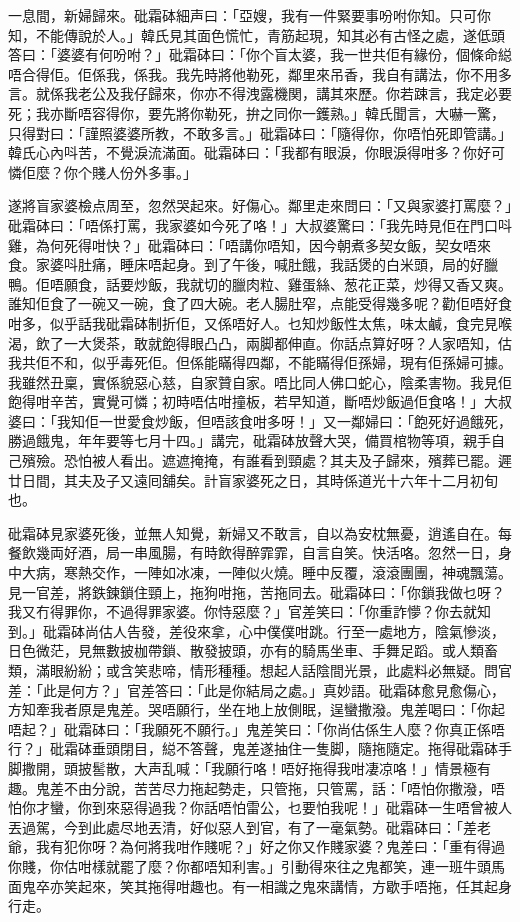 \documentclass[a5paper, 12pt, openany]{book} %
\begin{document}
	一息間，新婦歸來。砒霜砵細声曰：「亞嫂，我有一件緊要事吩咐你知。只可你知，不能傳說於人。」韓氏見其面色慌忙，青筋起現，知其必有古怪之處，遂低頭答曰：「婆婆有何吩咐？」砒霜砵曰：「你个盲太婆，我一世共佢有緣份，個條命縂唔合得佢。佢係我，係我。我先時將他勒死，鄰里來吊香，我自有講法，你不用多言。就係我老公及我仔歸來，你亦不得洩露機関，講其來歷。你若踈言，我定必要死；我亦斷唔容得你，要先將你勒死，拚之同你一鑊熟。」韓氏聞言，大嚇一驚，只得對曰：「謹照婆婆所教，不敢多言。」砒霜砵曰：「隨得你，你唔怕死即管講。」韓氏心內呌苦，不覺淚流滿面。砒霜砵曰：「我都有眼淚，你眼淚得咁多？你好可憐佢麼？你个賤人份外多事。」

	遂將盲家婆檢点周至，忽然哭起來。好傷心。鄰里走來問曰：「又與家婆打罵麼？」砒霜砵曰：「唔係打罵，我家婆如今死了咯！」大叔婆驚曰：「我先時見佢在門口呌雞，為何死得咁快？」砒霜砵曰：「唔講你唔知，因今朝煮多契女飯，契女唔來食。家婆呌肚痛，睡床唔起身。到了午後，喊肚餓，我話煲的白米頭，局的好臘鴨。佢唔願食，話要炒飯，我就切的臘肉粒、雞蛋絲、葱花正菜，炒得又香又爽。誰知佢食了一碗又一碗，食了四大碗。老人腸肚窄，点能受得幾多呢？勸佢唔好食咁多，似乎話我砒霜砵制折佢，又係唔好人。乜知炒飯性太焦，味太鹹，食完見喉渴，飲了一大煲茶，敢就飽得眼凸凸，兩脚都伸直。你話点算好呀？人家唔知，估我共佢不和，似乎毒死佢。但係能瞞得四鄰，不能瞞得佢孫婦，現有佢孫婦可據。我雖然丑稟，實係貌惡心慈，自家贊自家。唔比同人佛口蛇心，陰柔害物。我見佢飽得咁辛苦，實覺可憐；初時唔估咁撞板，若早知道，斷唔炒飯過佢食咯！」大叔婆曰：「我知佢一世愛食炒飯，但唔該食咁多呀！」又一鄰婦曰：「飽死好過餓死，勝過餓鬼，年年要等七月十四。」講完，砒霜砵放聲大哭，備買棺物等項，親手自己殯殮。恐怕被人看出。遮遮掩掩，有誰看到頸處？其夫及子歸來，殯葬已罷。遲廿日間，其夫及子又遠囘舖矣。計盲家婆死之日，其時係道光十六年十二月初旬也。

	砒霜砵見家婆死後，並無人知覺，新婦又不敢言，自以為安枕無憂，逍遙自在。每餐飲幾両好酒，局一串風腸，有時飲得醉霏霏，自言自笑。快活咯。忽然一日，身中大病，寒熱交作，一陣如冰凍，一陣似火燒。睡中反覆，滾滾團團，神魂飄蕩。見一官差，將鉄鍊鎖住頸上，拖狗咁拖，苦拖同去。砒霜砵曰：「你鎖我做乜呀？我又冇得罪你，不過得罪家婆。你恃惡麼？」官差笑曰：「你重詐懜？你去就知到。」砒霜砵尚估人告發，差役來拿，心中僕僕咁跳。行至一處地方，陰氣慘淡，日色微茫，見無數披枷帶鎖、散發披頭，亦有的騎馬坐車、手舞足蹈。或人類畜類，滿眼紛紛；或含笑悲啼，情形種種。想起人話陰間光景，此處料必無疑。問官差：「此是何方？」官差答曰：「此是你結局之處。」真妙語。砒霜砵愈見愈傷心，方知牽我者原是鬼差。哭唔願行，坐在地上放側眠，逞蠻撒潑。鬼差喝曰：「你起唔起？」砒霜砵曰：「我願死不願行。」鬼差笑曰：「你尚估係生人麼？你真正係唔行？」砒霜砵垂頭閉目，縂不答聲，鬼差遂抽住一隻脚，隨拖隨定。拖得砒霜砵手脚撒開，頭披䯻散，大声乱喊：「我願行咯！唔好拖得我咁凄凉咯！」情景極有趣。鬼差不由分說，苦苦尽力拖起勢走，只管拖，只管罵，話：「唔怕你撒潑，唔怕你才蠻，你到來惡得過我？你話唔怕雷公，乜要怕我呢！」砒霜砵一生唔曾被人丟過駕，今到此處尽地丟清，好似惡人到官，有了一毫氣勢。砒霜砵曰：「差老爺，我有犯你呀？為何將我咁作賤呢？」好之你又作賤家婆？鬼差曰：「重有得過你賤，你估咁樣就罷了麼？你都唔知利害。」引動得來往之鬼都笑，連一班牛頭馬面鬼卒亦笑起來，笑其拖得咁趣也。有一相識之鬼來講情，方歇手唔拖，任其起身行走。
\end{document}
